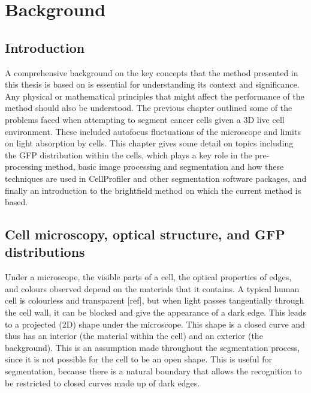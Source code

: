 
\chapter{Background}

\ifpdf
    \graphicspath{{Chapter3/Figs/Raster/}{Chapter3/Figs/PDF/}{Chapter3/Figs/}}
\else
    \graphicspath{{Chapter3/Figs/Vector/}{Chapter3/Figs/}}
\fi

\section{Introduction}

A comprehensive background on the key concepts that the method presented in this thesis is based on is essential for understanding its context and significance. Any physical or mathematical principles that might affect the performance of the method should also be understood. The previous chapter outlined some of the problems faced when attempting to segment cancer cells given a 3D live cell environment. These included autofocus fluctuations of the microscope and limits on light absorption by cells. This chapter gives some detail on topics including the GFP distribution within the cells, which plays a key role in the pre-processing method, basic image processing and segmentation and how these techniques are used in CellProfiler and other segmentation software packages, and finally an introduction to the brightfield method on which the current method is based.

\section{Cell microscopy, optical structure, and GFP distributions}

Under a microscope, the visible parts of a cell, the optical properties of edges, and colours observed depend on the materials that it contains. A typical human cell is colourless and transparent [ref], but when light passes tangentially through the cell wall, it can be blocked and give the appearance of a dark edge. This leads to a projected (2D) shape under the microscope. This shape is a closed curve and thus has an interior (the material within the cell) and an exterior (the background). This is an assumption made throughout the segmentation process, since it is not possible for the cell to be an open shape. This is useful for segmentation, because there is a natural boundary that allows the recognition to be restricted to closed curves made up of dark edges.


